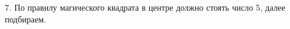 7. По правилу магического квадрата в центре должно стоять число 5, далее подбираем.
\begin{center}
\begin{figure}[h!]
\end{figure}
\end{center}
